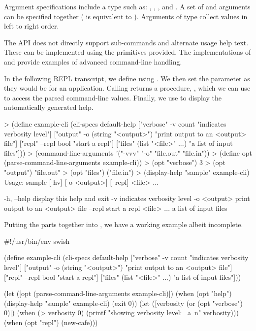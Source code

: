 Argument specifications include a type such as: ,
, , and .  A set of 
and  arguments can be specified together ( is
equivalent to   ). Arguments of type
 collect values in left to right order.

The API does not directly support sub-commands and alternate usage
help text. These can be implemented using the primitives provided. The
implementations of  and  provide
examples of advanced command-line handling.

In the following REPL transcript, we define  using
. We then set the 
parameter as they would be for an application. Calling
 returns a procedure, ,
which we can use to access the parsed command-line values. Finally, we use
 to display the automatically generated help.

\codebegin
> (define example-cli
    (cli-specs
     default-help
     ["verbose" -v count "indicates verbosity level"]
     ["output" -o (string "<output>") "print output to an <output> file"]
     ["repl" --repl bool "start a repl"]
     ["files" (list "<file>" ...) "a list of input files"]))
> (command-line-arguments '("-vvv" "-o" "file.out" "file.in"))
> (define opt (parse-command-line-arguments example-cli))
> (opt "verbose")
3
> (opt "output")
"file.out"
> (opt "files")
("file.in")
> (display-help "sample" example-cli)
Usage: sample [-hv] [-o <output>] [--repl] <file> ...

  -h, --help        display this help and exit
  -v                indicates verbosity level
  -o <output>       print output to an <output> file
  --repl            start a repl
  <file> ...        a list of input files
\codeend

Putting the parts together into , we have a working
example albeit incomplete.

\codebegin\fixtilde
#!/usr/bin/env swish

(define example-cli
  (cli-specs
   default-help
   ["verbose" -v count "indicates verbosity level"]
   ["output" -o (string "<output>") "print output to an <output> file"]
   ["repl" --repl bool "start a repl"]
   ["files" (list "<file>" ...) "a list of input files"]))

(let ([opt (parse-command-line-arguments example-cli)])
  (when (opt "help")
    (display-help "sample" example-cli)
    (exit 0))
  (let ([verbosity (or (opt "verbose") 0)])
    (when (> verbosity 0)
      (printf "showing verbosity level: ~a~n" verbosity)))
  (when (opt "repl")
    (new-cafe)))
\codeend

